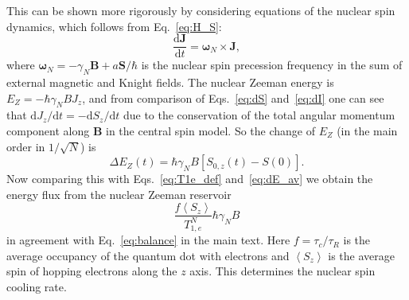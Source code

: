 \documentclass[prl,nobibnotes,twocolumn,aps,longbibliography,superscriptaddress,notoc]{revtex4-1}
\renewcommand{\d}{\mathrm d}
\newcommand{\braket}[1]{\left\langle #1 \right\rangle}
\begin{document}
This can be shown more rigorously by considering equations of the nuclear spin dynamics, which follows from Eq.~\eqref{eq:H_S}:
\begin{equation}
  \label{eq:dI}
  \frac{\d\bm J}{\d t}=\bm\omega_N\times\bm J,
\end{equation}
where $\bm\omega_N=-\gamma_N\bm B+a\bm S/\hbar$ is the nuclear spin precession frequency in the sum of external magnetic and Knight fields. The nuclear Zeeman energy is $E_Z=-\hbar\gamma_NBJ_z$, and from comparison of Eqs.~\eqref{eq:dS} and~\eqref{eq:dI} one can see that $\d J_z/\d t=-\d S_z/\d t$ due to the conservation of the total angular momentum component along $\bm B$ in the central spin model. So the change of $E_Z$ (in the main order in $1/\sqrt{N}$) is
\begin{equation}
  \Delta E_Z(t)=\hbar\gamma_NB\left[S_{0,z}(t)-S(0)\right].
\end{equation}
Now comparing this with Eqs.~\eqref{eq:T1e_def} and~\eqref{eq:dE_av} we obtain the energy flux from the nuclear Zeeman reservoir
\begin{equation}
  \frac{f\braket{S_z}}{T_{1,e}^N}\hbar\gamma_N B
\end{equation}
in agreement with Eq.~\eqref{eq:balance} in the main text. Here $f=\tau_c/\tau_R$ is the average occupancy of the quantum dot with electrons and $\braket{S_z}$ is the average spin of hopping electrons along the $z$ axis. This determines the nuclear spin cooling rate.
\end{document}
